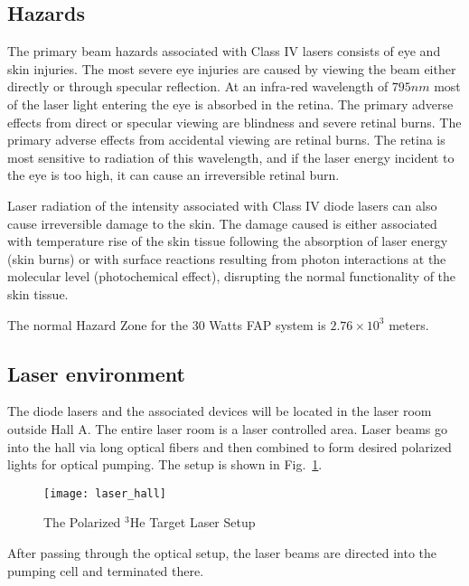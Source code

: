 {\subsection{Hazards}

The primary beam hazards associated with Class IV lasers consists of eye and skin
injuries. The most severe eye injuries are caused by viewing the beam either directly
or through specular reflection. At an infra-red wavelength of $795 nm$ most of the
laser light entering the eye is absorbed in the retina. The primary adverse effects
from direct or specular viewing are blindness and severe retinal burns. The primary
adverse effects from accidental viewing are retinal burns. The retina is most
sensitive to radiation of this wavelength, and if the laser energy incident to the eye
is too high, it can cause an irreversible retinal burn.

Laser radiation of the intensity associated with Class IV diode lasers can also
cause irreversible damage to the skin. The damage caused is either associated with
temperature rise of the skin tissue following the absorption of laser energy (skin
burns) or with surface reactions resulting from photon interactions at the molecular
level (photochemical effect), disrupting the normal functionality of the skin tissue.

The normal Hazard Zone for the 30 Watts FAP system is $2.76 \times 10^3$ meters.


\subsection{Laser environment}

The diode lasers and the associated devices will be located in the
laser room outside Hall A.  The entire laser room is a
laser controlled area. Laser beams go into the hall via long optical fibers
and then combined to form desired polarized lights for optical pumping.
The setup is shown in
Fig.~\ref{fig:laser_hall}.


\begin{figure}
  \centerline{\texttt{[image: laser\_hall]}}
  \caption[Polarized $^3$He Laser Setup]{The Polarized $^3$He Target Laser 
Setup}
   \label{fig:laser_hall} 
\end{figure}

After passing through the optical setup, the laser beams 
are directed into the pumping cell and terminated there. 

}
